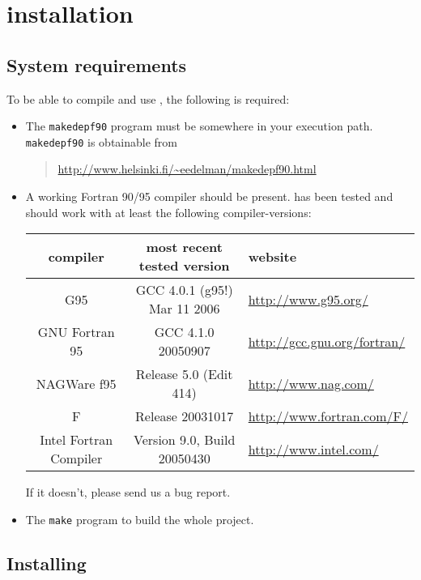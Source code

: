 \chapter{\qmcpack{} installation}

\section{System requirements}

To be able to compile and use \qmcpack{}, the following is required:

\begin{itemize}
\item The \texttt{makedepf90} program must be somewhere in your execution path.
      \texttt{makedepf90} is obtainable from
      \begin{quote}
      \url{http://www.helsinki.fi/~eedelman/makedepf90.html}
      \end{quote}
\item A working Fortran 90/95 compiler should be present.  \qmcpack{} has been
      tested and should work with at least the following compiler-versions:
      \begin{center}
       \begin{tabular}{|ccl|} \hline
          compiler               & most recent tested version & website \\ \hline
          G95                    & GCC 4.0.1 (g95!) Mar 11 2006 & \url{http://www.g95.org/} \\
          GNU Fortran 95         & GCC 4.1.0 20050907 & \url{http://gcc.gnu.org/fortran/} \\
          NAGWare f95            & Release 5.0 (Edit 414) & \url{http://www.nag.com/} \\
          F                      & Release 20031017 & \url{http://www.fortran.com/F/} \\
          Intel Fortran Compiler & Version 9.0, Build 20050430 & \url{http://www.intel.com/} \\ \hline
       \end{tabular}
      \end{center}
      If it doesn't, please send us a bug report.

\item The \verb!make! program to build the whole project.
\end{itemize}

\section{Installing \qmcpack{}}

